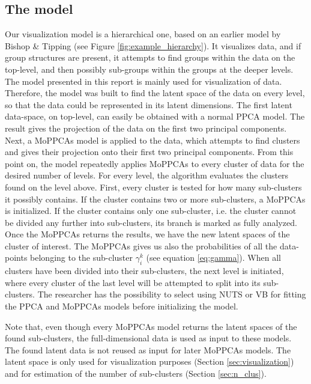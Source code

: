 \subsection{The model}
Our visualization model is a hierarchical one, based on an earlier model by Bishop \& Tipping \cite{bishop1998hierarchical} (see Figure \ref{fig:example_hierarchy}). It visualizes data, and if group structures are present, it attempts to find groups within the data on the top-level, and then possibly sub-groups within the groups at the deeper levels. The model presented in this report is mainly used for visualization of data. Therefore, the model was built to find the latent space of the data on every level, so that the data could be represented in its latent dimensions. The first latent data-space, on top-level, can easily be obtained with a normal PPCA model. The result gives the projection of the data on the first two principal components. Next, a MoPPCAs model is applied to the data, which attempts to find clusters and gives their projection onto their first two principal components. From this point on, the model repeatedly applies MoPPCAs to every cluster of data for the desired number of levels. For every level, the algorithm evaluates the clusters found on the level above. First, every cluster is tested for how many sub-clusters it possibly contains. If the cluster contains two or more sub-clusters, a MoPPCAs is initialized. If the cluster contains only one sub-cluster, i.e. the cluster cannot be divided any further into sub-clusters, its branch is marked as fully analyzed. Once the MoPPCAs returns the results, we have the new latent spaces of the cluster of interest. The MoPPCAs gives us also the probabilities of all the data-points belonging to the sub-cluster $\gamma^k_i$ (see equation \ref{eq:gamma}). When all clusters have been divided into their sub-clusters, the next level is initiated, where every cluster of the last level will be attempted to split into its sub-clusters. The researcher has the possibility to select using NUTS or VB for fitting the PPCA and MoPPCAs models before initializing the model.

Note that, even though every MoPPCAs model returns the latent spaces of the found sub-clusters, the full-dimensional data is used as input to these models. The found latent data is not reused as input for later MoPPCAs models. The latent space is only used for visualization purposes (Section \ref{sec:visualization}) and for estimation of the number of sub-clusters (Section \ref{sec:n_clus}).

